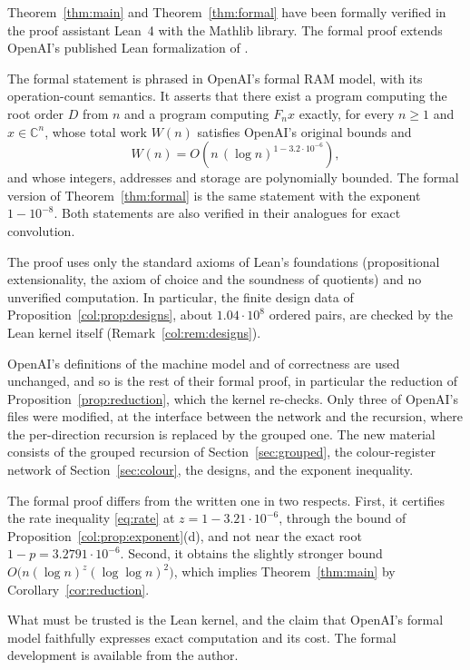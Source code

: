 \documentclass[11pt]{article}
\theoremstyle{definition}
\theoremstyle{remark}
\newcommand{\C}{\mathbb{C}}
\begin{document}
Theorem~\ref{thm:main} and Theorem~\ref{thm:formal} have been formally verified in the proof assistant
Lean~4 with the Mathlib library. The formal proof extends OpenAI's published Lean formalization
\cite{oailean} of \cite{oai}.

The formal statement is phrased in OpenAI's formal RAM model, with its operation-count semantics. It
asserts that there exist a program computing the root order $D$ from $n$ and a program computing
$F_nx$ exactly, for every $n\ge1$ and $x\in\C^n$, whose total work $W(n)$ satisfies OpenAI's original
bounds and
\[
  W(n)=O\!\left(n\,(\log n)^{1-3.2\cdot10^{-6}}\right),
\]
and whose integers, addresses and storage are polynomially bounded. The formal version of
Theorem~\ref{thm:formal} is the same statement with the exponent $1-10^{-8}$. Both statements are
also verified in their analogues for exact convolution.

The proof uses only the standard axioms of Lean's foundations (propositional extensionality, the axiom
of choice and the soundness of quotients) and no unverified computation. In particular, the finite
design data of Proposition~\ref{col:prop:designs}, about $1.04\cdot10^8$ ordered pairs, are checked by
the Lean kernel itself (Remark~\ref{col:rem:designs}).

OpenAI's definitions of the machine model and of correctness are used unchanged, and so is the rest
of their formal proof, in particular the reduction of Proposition~\ref{prop:reduction}, which the
kernel re-checks. Only three of OpenAI's files were modified, at the interface between the network and
the recursion, where the per-direction recursion is replaced by the grouped one. The new material
consists of the grouped recursion of Section~\ref{sec:grouped}, the colour-register network of
Section~\ref{sec:colour}, the designs, and the exponent inequality.

The formal proof differs from the written one in two respects. First, it certifies the rate
inequality \eqref{eq:rate} at $z=1-3.21\cdot10^{-6}$, through the bound of
Proposition~\ref{col:prop:exponent}(d), and not near the exact root $1-p=3.2791\cdot10^{-6}$.
Second, it obtains the slightly stronger bound $O\big(n(\log n)^z(\log\log n)^2\big)$, which implies
Theorem~\ref{thm:main} by Corollary~\ref{cor:reduction}.

What must be trusted is the Lean kernel, and the claim that OpenAI's formal model faithfully
expresses exact computation and its cost. The formal development is available from the author.
\end{document}
